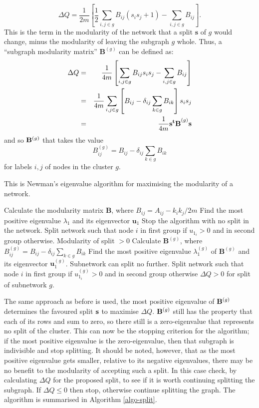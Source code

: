 \begin{equation}
\Delta Q  =  \frac{1}{2m} \left[ \frac{1}{2}\sum_{i,j\in g}B_{ij}(s_is_j + 1) - \sum_{i,j \in g} B_{ij} \right].
\end{equation}
This is the term in the modularity of the network that a split $\mathbf{s}$ of 
$g$ would change, minus the modularity of leaving the subgraph $g$ whole.  Thus, a ``subgraph modularity matrix'' $\mathbf{B}^{(g)}$ can be defined as:
\begin{eqnarray}
\Delta Q & = & \frac{1}{4m}\left[ \sum_{i,j \in g} B_{ij}s_is_j - \sum_{i,j \in g}B_{ij}\right] \cr
& = & \frac{1}{4m}\sum_{i,j \in g}\left[ B_{ij} - \delta_{ij}\sum_{k \in g} B_{ik}\right]s_is_j \cr
& = & \frac{1}{4m}{\bf s^tB}^{(g)}{\bf s}
\end{eqnarray}
and so ${\bf B}^{(g)}$ that takes the value
\begin{equation}
B^{(g)}_{ij} = B_{ij} - \delta_{ij}\sum_{k \in g} B_{ik}
\end{equation}
for labels $i,j$ of nodes in the cluster $g$.

\begin{algorithm}
\caption{This is Newman's eigenvalue algorithm for maximising the modularity of a network.}
\label{algo-split}
\begin{algorithmic}
\STATE Calculate the modularity matrix $\mathbf{B}$, where $B_{ij} = A_{ij} - k_ik_j/2m$
\STATE Find the most positive eigenvalue $\lambda_1$ and its eigenvector $\mathbf{u}_1$
\STATE Stop the algorithm with no split in the network.
\ELSE
\STATE Split network such that node $i$ in first group if $u_{1_{i}} > 0$ and in second group otherwise.
\ENSURE Modularity of split $> 0$
\ENDIF
{}
\STATE Calculate $\mathbf{B}^{(g)}$, where $B^{(g)}_{ij} = B_{ij} - \delta_{ij}\sum_{k\in g}B_{ik}$
\STATE Find the most positive eigenvalue $\lambda^{(g)}_1$ of $\mathbf{B}^{(g)}$ and its eigenvector $\mathbf{u}^{(g)}_1$.
\STATE Subnetwork can split no further.
\ELSE
\STATE Split network such that node $i$ in first group if $u^{(g)}_{1_{i}} > 0$ and in second group otherwise
\ENSURE $\Delta Q > 0$ for split of subnetwork $g$.
\ENDIF
\ENDFOR
\end{algorithmic}
\end{algorithm}

The same approach as before is used, the most
positive eigenvalue of ${\bf B}^{(g)}$ determines the favoured split
${\bf s}$ to maximise $\Delta Q$. ${\bf B}^{(g)}$ still has the
property that each of its rows and sum to zero, so there still is a
zero-eigenvalue that represents no split of the cluster.  This can
now be the stopping criterion for the algorithm; if the most positive eigenvalue is the
zero-eigenvalue, then that subgraph is indivisible and stop
splitting.  It should be noted, however, that as the most
positive eigenvalue gets smaller, relative to its negative
eigenvalues, there may be no benefit to the modularity of accepting
such a split.  In this case  check, by calculating $\Delta Q$ for
the proposed split, to see if it is worth continuing splitting the subgraph.
If $\Delta Q \leq 0$ then stop, otherwise continue
splitting the graph.  The algorithm is summarised in Algorithm \ref{algo-split}.  

